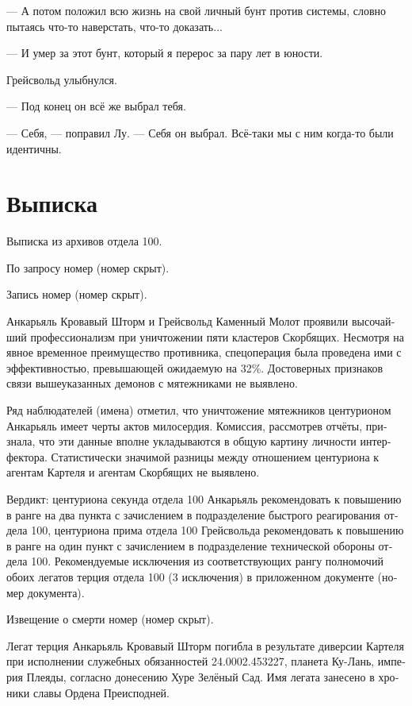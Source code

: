 \documentclass[a4paper,12pt,fleqn]{book}\usepackage{cooltooltips}\usepackage{polyglossia}\setdefaultlanguage[babelshorthands=true]{russian}\setotherlanguage{english}\defaultfontfeatures{Ligatures=TeX,Mapping=tex-text} \usepackage{xcolor}\definecolor{lightgray}{HTML}{bbbbbb}\color{lightgray}\newcommand{\ml}[3]{\textenglish{\textcolor{black}{#3}}}
\begin{document}
{--- А потом положил всю жизнь на свой личный бунт против системы, словно пытаясь что-то наверстать, что-то доказать...

--- И умер за этот бунт, который я перерос за пару лет в юности.

Грейсвольд улыбнулся.

--- Под конец он всё же выбрал тебя.

--- Себя, --- поправил Лу.
--- Себя он выбрал.
Всё-таки мы с ним когда-то были идентичны.

\section{Выписка}

Выписка из архивов отдела 100.

По запросу номер (номер скрыт).

Запись номер (номер скрыт).

Анкарьяль Кровавый Шторм и Грейсвольд Каменный Молот проявили высочайший профессионализм при уничтожении пяти кластеров Скорбящих.
Несмотря на явное временное преимущество противника, спецоперация была проведена ими с эффективностью, превышающей ожидаемую на 32\%.
Достоверных признаков связи вышеуказанных демонов с мятежниками не выявлено.

Ряд наблюдателей (имена) отметил, что уничтожение мятежников центурионом Анкарьяль имеет черты актов милосердия.
Комиссия, рассмотрев отчёты, признала, что эти данные вполне укладываются в общую картину личности интерфектора.
Статистически значимой разницы между отношением центуриона к агентам Картеля и агентам Скорбящих не выявлено.

Вердикт: центуриона секунда отдела 100 Анкарьяль рекомендовать к повышению в ранге на два пункта с зачислением в подразделение быстрого реагирования отдела 100, центуриона прима отдела 100 Грейсвольда рекомендовать к повышению в ранге на один пункт с зачислением в подразделение технической обороны отдела 100.
Рекомендуемые исключения из соответствующих рангу полномочий обоих легатов терция отдела 100 (3 исключения) в приложенном документе (номер документа).

Извещение о смерти номер (номер скрыт).

Легат терция Анкарьяль Кровавый Шторм погибла в результате диверсии Картеля при исполнении служебных обязанностей 24.0002.453227, планета Ку-Лань, империя Плеяды, согласно донесению Хуре Зелёный Сад.
Имя легата занесено в хроники славы Ордена Преисподней.

}
\end{document}
